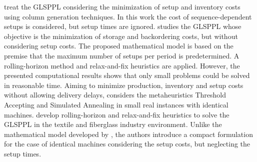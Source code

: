 \documentclass[11pt]{article}
\begin{document}
\cite{kang1999lotsizing} treat the GLSPPL considering the minimization of setup and inventory costs using column generation techniques. In this work the cost of sequence-dependent setups is considered, but setup times are ignored. \cite{clark2000rolling} studies the GLSPPL whose objective is the minimization of storage and backordering costs, but without considering setup costs. The proposed mathematical model is based on the premise that the maximum number of setups per period is predetermined. A rolling-horizon method and relax-and-fix heuristics are applied. However, the presented computational results shows that only small problems could be solved in reasonable time. Aiming to minimize production, inventory and setup costs without allowing delivery delays, \cite{meyr2002simultaneous} considers the metaheuristics Threshold Accepting and Simulated Annealing in small real instances with identical machines. \cite{beraldi2008rolling} develop rolling-horizon and relax-and-fix heuristics to solve the GLSPPL in the textile and fiberglass industry environment. Unlike the mathematical model developed by \cite{meyr2002simultaneous}, the authors introduce a compact formulation for the case of identical machines considering the  setup costs, but neglecting the setup times. 
\end{document}
